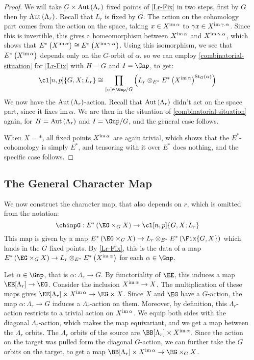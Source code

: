 \begin{proof}
	We will take $G \times \operatorname{Aut} \left(\Lambda_r\right)$ fixed points of \cref{Lr-Fix} in two steps, first by $G$ then by $\operatorname{Aut} \left(\Lambda_r\right)$.
	Recall that $L_r$ is fixed by $G$.
	The action on the cohomology part comes from the action on the space, taking $x \in X^{\operatorname{im} \alpha}$ to $\gamma x \in X^{\operatorname{im} \gamma.\alpha}$.
	Since this is invertible, this gives a homeomorphism between $X^{\operatorname{im} \alpha}$ and $X^{\operatorname{im} \gamma.\alpha}$, which shows that $E^*\left(X^{\operatorname{im} \alpha}\right) \cong E^*\left(X^{\operatorname{im} \gamma.\alpha}\right)$.
	Using this isomorphism, we see that $E^*\left(X^{\operatorname{im} \alpha}\right)$ depends only on the $G$-orbit of $\alpha$, so we can employ \cref{combinatorial-situation} for \cref{Lr-Fix} with $H = G$ and $I = \Gnp$, to get:
	$$
	\cl[n,p]{G,X; L_r}
	\cong \prod_{\left[\alpha\right] \in \Gnp/G} \left(L_r \otimes_{E^*} E^*\left(X^{\im \alpha}\right)^{\stab_G\left(\alpha\right)}\right)
	$$
	We now have the $\operatorname{Aut} \left(\Lambda_r\right)$-action.
	Recall that $\operatorname{Aut} \left(\Lambda_r\right)$ didn't act on the space part, since it fixes $\operatorname{im} \alpha$.
	We are then in the situation of \cref{combinatorial-situation} again, for $H = \operatorname{Aut} \left(\Lambda_r\right)$ and $I = \Gnp/G$, and the general case follows.
	
	When $X = *$, all fixed points $X^{\operatorname{im} \alpha}$ are again trivial, which shows that the $E^*$-cohomology is simply $E^*$, and tensoring with it over $E^*$ does nothing, and the specific case follows.
\end{proof}



\subsection{The General Character Map}

We now construct the character map, that also depends on $r$, which is omitted from the notation:
$$\chinpG: E^*\left(\EG \times_G X\right) \to \cl[n,p]{G,X; L_r}$$
This map is given by a map $E^*\left(\EG \times_G X\right) \to L_r \otimes_{E^*} E^*\left(\Fix{G,X}\right)$ which lands in the $G$ fixed points.
By \cref{Lr-Fix}, this is the data of a map $E^*\left(\EG \times_G X\right) \to L_r \otimes_{E^*} E^*\left(X^{\im \alpha}\right)$ for each $\alpha \in \Gnp$.

Let $\alpha \in \Gnp$, that is $\alpha: \Lambda_r \to G$.
By functoriality of $\EE$, this induces a map $\EE[\Lambda_r] \to \EG$.
Consider the inclusion $X^{\operatorname{im} \alpha} \to X$.
The multiplication of these maps gives $\EE[\Lambda_r] \times X^{\im \alpha} \to \EG \times X$.
Since $X$ and $\EG$ have a $G$-action, the map $\alpha: \Lambda_r \to G$ induces a $\Lambda_r$-action on them.
Moreover, by definition, this $\Lambda_r$-action restricts to a trivial action on $X^{\operatorname{im} \alpha}$.
We equip both sides with the diagonal $\Lambda_r$-action, which makes the map equivariant, and we get a map between the $\Lambda_r$ orbits.
The $\Lambda_r$ orbits of the source are $\BB[\Lambda_r] \times X^{\im \alpha}$.
Since the action on the target was pulled form the diagonal $G$-action, we can further take the $G$ orbits on the target, to get a map $\BB[\Lambda_r] \times X^{\im \alpha} \to \EG \times_G X$.


